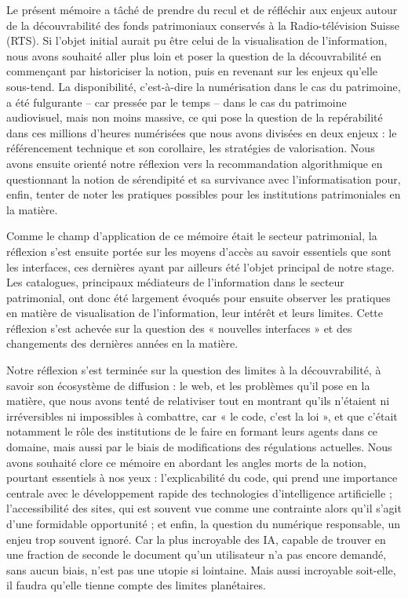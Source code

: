 \documentclass[a4paper,12pt,twoside]{book}
\begin{document}
	Le présent mémoire a tâché de prendre du recul et de réfléchir aux enjeux autour de la découvrabilité des fonds patrimoniaux conservés à la Radio-télévision Suisse (RTS). Si l'objet initial aurait pu être celui de la visualisation de l'information, nous avons souhaité aller plus loin et poser la question de la découvrabilité en commençant par historiciser la notion, puis en revenant sur les enjeux qu'elle sous-tend. La disponibilité, c'est-à-dire la numérisation dans le cas du patrimoine, a été fulgurante – car pressée par le temps – dans le cas du patrimoine audiovisuel, mais non moins massive, ce qui pose la question de la repérabilité dans ces millions d'heures numérisées que nous avons divisées en deux enjeux : le référencement technique et son corollaire, les stratégies de valorisation. Nous avons ensuite orienté notre réflexion vers la recommandation algorithmique en questionnant la notion de sérendipité et sa survivance avec l'informatisation pour, enfin, tenter de noter les pratiques possibles pour les institutions patrimoniales en la matière.
	
	Comme le champ d'application de ce mémoire était le secteur patrimonial, la réflexion s'est ensuite portée sur les moyens d'accès au savoir essentiels que sont les interfaces, ces dernières ayant par ailleurs été l'objet principal de notre stage. Les catalogues, principaux médiateurs de l'information dans le secteur patrimonial, ont donc été largement évoqués pour ensuite observer les pratiques en matière de visualisation de l'information, leur intérêt et leurs limites. Cette réflexion s'est achevée sur la question des « nouvelles interfaces » et des changements des dernières années en la matière.
	
	Notre réflexion s'est terminée sur la question des limites à la découvrabilité, à savoir son écosystème de diffusion : le web, et les problèmes qu'il pose en la matière, que nous avons tenté de relativiser tout en montrant qu'ils n'étaient ni irréversibles ni impossibles à combattre, car « le code, c'est la loi », et que c'était notamment le rôle des institutions de le faire en formant leurs agents dans ce domaine, mais aussi par le biais de modifications des régulations actuelles. Nous avons souhaité clore ce mémoire en abordant les angles morts de la notion, pourtant essentiels à nos yeux : l'explicabilité du code, qui prend une importance centrale avec le développement rapide des technologies d'intelligence artificielle ; l'accessibilité des sites, qui est souvent vue comme une contrainte alors qu'il s'agit d'une formidable opportunité ; et enfin, la question du numérique responsable, un enjeu trop souvent ignoré. Car la plus incroyable des IA, capable de trouver en une fraction de seconde le document qu'un utilisateur n'a pas encore demandé, sans aucun biais, n'est pas une utopie si lointaine. Mais aussi incroyable soit-elle, il faudra qu'elle tienne compte des limites planétaires.
	
\end{document}
